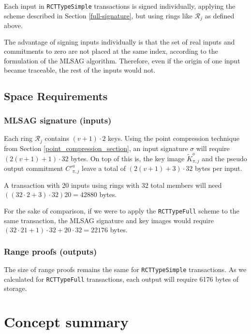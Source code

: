 Each input in {\tt RCTTypeSimple} transactions is signed individually, applying the scheme described in Section \ref{full-signature}, but using rings like \(\mathcal{R}_j\) as defined above.

The advantage of signing inputs individually is that the set of real inputs and commitments to zero are not placed at the same index, according to the formulation of the MLSAG algorithm. Therefore, even if the origin of one input became traceable, the rest of the inputs would not.


\subsection{Space Requirements}

\subsubsection*{MLSAG signature (inputs)}

Each ring \(\mathcal{R}_j\) contains \((v+1) \cdot 2\) keys. Using the point compression technique from Section \ref{point_compression_section}, an input signature $\sigma$ will require \( (2(v+1) + 1) \cdot 32  \) bytes. On top of this is, the key image $\tilde{K}^o_{\pi,j}$ and the pseudo output commitment $C'^a_{\pi,j}$ leave a total of $(2(v+1)+3) \cdot 32$ bytes per input.

A transaction with 20 inputs using rings with 32 total members will need \(((32 \cdot 2 + 3) \cdot 32) 20 = 42880 \) bytes.

For the sake of comparison, if we were to apply the {\tt RCTTypeFull} scheme to the same transaction, the MLSAG signature and key images would require \(( 32 \cdot 21 + 1) \cdot 32 + 20 \cdot 32 = 22176\) bytes.


\subsubsection*{Range proofs (outputs)}

The size of range proofs remains the same for {\tt RCTTypeSimple} transactions. As we calculated for {\tt RCTTypeFull} transactions, each output will require 6176 bytes of storage.



\newpage
\section{Concept summary}
\label{sec:transaction_summary}

